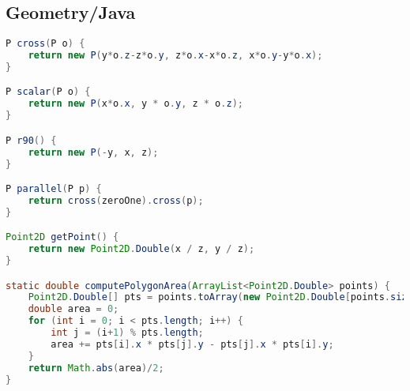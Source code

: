\subsection{Geometry/Java}
\begin{lstlisting}[language=Java]
P cross(P o) {
	return new P(y*o.z-z*o.y, z*o.x-x*o.z, x*o.y-y*o.x);
}

P scalar(P o) {
	return new P(x*o.x, y * o.y, z * o.z);
}

P r90() {
	return new P(-y, x, z);
}

P parallel(P p) {
	return cross(zeroOne).cross(p);
}

Point2D getPoint() {
	return new Point2D.Double(x / z, y / z);
}

static double computePolygonArea(ArrayList<Point2D.Double> points) {
	Point2D.Double[] pts = points.toArray(new Point2D.Double[points.size()]);
	double area = 0;
	for (int i = 0; i < pts.length; i++) {
		int j = (i+1) % pts.length;
		area += pts[i].x * pts[j].y - pts[j].x * pts[i].y;
	}
	return Math.abs(area)/2;
}
\end{lstlisting}